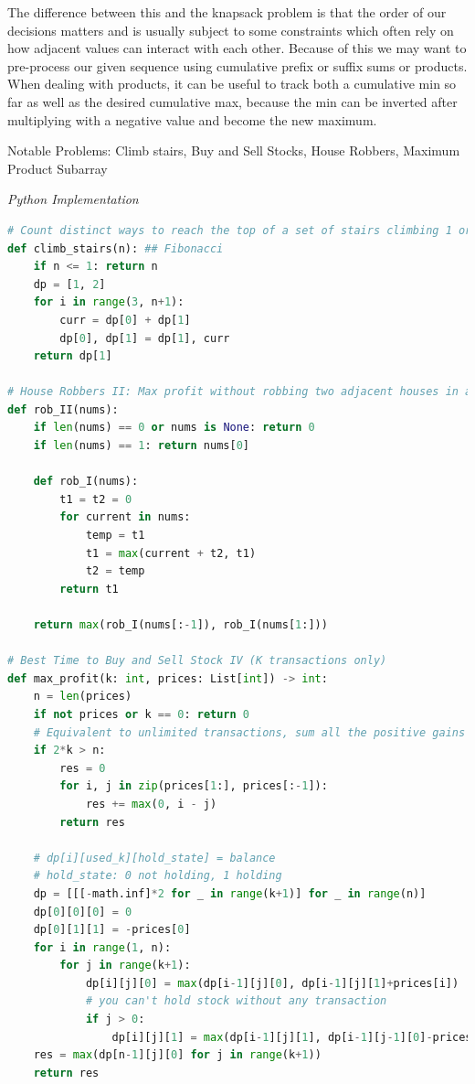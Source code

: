 \documentclass{article}
\begin{document}
The difference between this and the knapsack problem is that the order of our decisions matters and is usually subject to some constraints which often rely on how adjacent values can interact with each other. Because of this we may want to pre-process our given sequence using cumulative prefix or suffix sums or products. When dealing with products, it can be useful to track both a cumulative min so far as well as the desired cumulative max, because the min can be inverted after multiplying with a negative value and become the new maximum.

Notable Problems: Climb stairs, Buy and Sell Stocks, House Robbers, Maximum Product Subarray

\vspace{8pt} \emph{Python Implementation}
\begin{lstlisting}[language=Python]
# Count distinct ways to reach the top of a set of stairs climbing 1 or 2 steps at a time
def climb_stairs(n): ## Fibonacci
    if n <= 1: return n
    dp = [1, 2]
    for i in range(3, n+1):
        curr = dp[0] + dp[1]
        dp[0], dp[1] = dp[1], curr
    return dp[1]

# House Robbers II: Max profit without robbing two adjacent houses in a circular street
def rob_II(nums):
    if len(nums) == 0 or nums is None: return 0
    if len(nums) == 1: return nums[0]
        
    def rob_I(nums):
        t1 = t2 = 0
        for current in nums:
            temp = t1
            t1 = max(current + t2, t1)
            t2 = temp
        return t1
    
    return max(rob_I(nums[:-1]), rob_I(nums[1:]))

# Best Time to Buy and Sell Stock IV (K transactions only)
def max_profit(k: int, prices: List[int]) -> int:
    n = len(prices)
    if not prices or k == 0: return 0
    # Equivalent to unlimited transactions, sum all the positive gains
    if 2*k > n:
        res = 0
        for i, j in zip(prices[1:], prices[:-1]):
            res += max(0, i - j)
        return res

    # dp[i][used_k][hold_state] = balance
    # hold_state: 0 not holding, 1 holding
    dp = [[[-math.inf]*2 for _ in range(k+1)] for _ in range(n)]
    dp[0][0][0] = 0
    dp[0][1][1] = -prices[0]
    for i in range(1, n):
        for j in range(k+1):
            dp[i][j][0] = max(dp[i-1][j][0], dp[i-1][j][1]+prices[i])
            # you can't hold stock without any transaction
            if j > 0:
                dp[i][j][1] = max(dp[i-1][j][1], dp[i-1][j-1][0]-prices[i])
    res = max(dp[n-1][j][0] for j in range(k+1))
    return res
\end{lstlisting}
\end{document}
